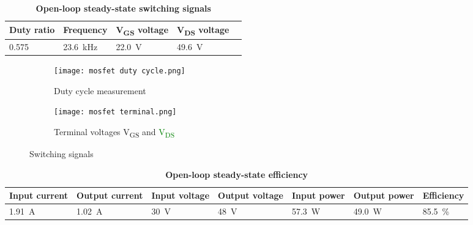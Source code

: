 \begin{table}[H]
    \centering
    \caption{\textbf{Open-loop steady-state switching signals}}
    \begin{tabularx}{\columnwidth}{|X|X|X|X|X|}
        \hline
        Duty ratio  & Frequency        & V\textsubscript{GS} voltage & V\textsubscript{DS} voltage \\
        \hline
        \num{0.575} & \qty{23.6}{\kHz} & \qty{22.0}{\V}              & \qty{49.6}{\V}              \\
        \hline
    \end{tabularx}
\end{table}
\begin{figure}[H]
    \begin{subfigure}{0.5\textwidth}
        \texttt{[image: mosfet duty cycle.png]}
        \caption{Duty cycle measurement}
    \end{subfigure}
    \hfill
    \begin{subfigure}{0.5\textwidth}
        \texttt{[image: mosfet terminal.png]}
        \caption{Terminal voltages \textcolor{Magenta1}{V\textsubscript{GS}} and \textcolor{green}{V\textsubscript{DS}}}
    \end{subfigure}
    \caption{Switching signals}
\end{figure}

\begin{table}[H]
    \centering
    \caption{\textbf{Open-loop steady-state efficiency}}
    \begin{tabularx}{\columnwidth}{|X|X|X|X|X|X|X|}
        \hline
        Input current       & Output current      & Input voltage & Output voltage & Input power       & Output power      & Efficiency           \\
        \hline
        \qty{1.91}{\ampere} & \qty{1.02}{\ampere} & \qty{30}{\V}  & \qty{48}{\V}   & \qty{57.3}{\watt} & \qty{49.0}{\watt} & \qty{85.5}{\percent} \\
        \hline
    \end{tabularx}
    \label{table:olsse}
\end{table}

